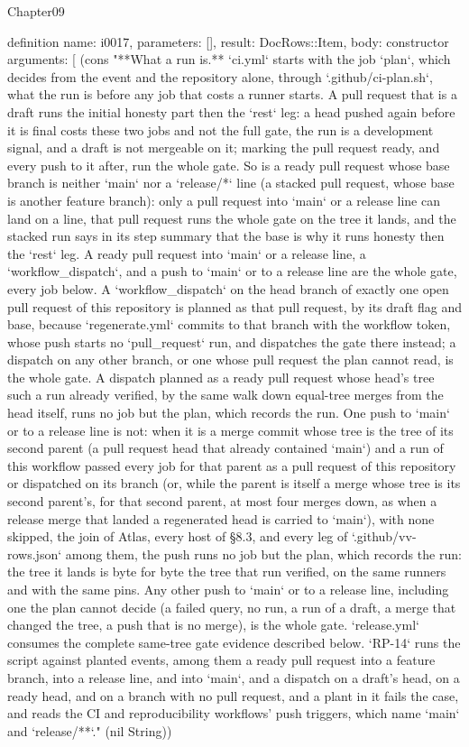 \begin{lexlean}{Chapter09}
\begin{semanticmodule}
definition{
  name: i0017,
  parameters: [],
  result: DocRows::Item,
  body: constructor{
    arguments: [
      (cons "**What a run is.** `ci.yml` starts with the job `plan`, which decides from the event and the repository alone, through `.github/ci-plan.sh`, what the run is before any job that costs a runner starts. A pull request that is a draft runs the initial honesty part then the `rest` leg: a head pushed again before it is final costs these two jobs and not the full gate, the run is a development signal, and a draft is not mergeable on it; marking the pull request ready, and every push to it after, run the whole gate. So is a ready pull request whose base branch is neither `main` nor a `release/*` line (a stacked pull request, whose base is another feature branch): only a pull request into `main` or a release line can land on a line, that pull request runs the whole gate on the tree it lands, and the stacked run says in its step summary that the base is why it runs honesty then the `rest` leg. A ready pull request into `main` or a release line, a `workflow_dispatch`, and a push to `main` or to a release line are the whole gate, every job below. A `workflow_dispatch` on the head branch of exactly one open pull request of this repository is planned as that pull request, by its draft flag and base, because `regenerate.yml` commits to that branch with the workflow token, whose push starts no `pull_request` run, and dispatches the gate there instead; a dispatch on any other branch, or one whose pull request the plan cannot read, is the whole gate. A dispatch planned as a ready pull request whose head's tree such a run already verified, by the same walk down equal-tree merges from the head itself, runs no job but the plan, which records the run. One push to `main` or to a release line is not: when it is a merge commit whose tree is the tree of its second parent (a pull request head that already contained `main`) and a run of this workflow passed every job for that parent as a pull request of this repository or dispatched on its branch (or, while the parent is itself a merge whose tree is its second parent's, for that second parent, at most four merges down, as when a release merge that landed a regenerated head is carried to `main`), with none skipped, the join of Atlas, every host of §8.3, and every leg of `.github/vv-rows.json` among them, the push runs no job but the plan, which records the run: the tree it lands is byte for byte the tree that run verified, on the same runners and with the same pins. Any other push to `main` or to a release line, including one the plan cannot decide (a failed query, no run, a run of a draft, a merge that changed the tree, a push that is no merge), is the whole gate. `release.yml` consumes the complete same-tree gate evidence described below. `RP-14` runs the script against planted events, among them a ready pull request into a feature branch, into a release line, and into `main`, and a dispatch on a draft's head, on a ready head, and on a branch with no pull request, and a plant in it fails the case, and reads the CI and reproducibility workflows' push triggers, which name `main` and `release/**`." (nil String))
}}
\end{semanticmodule}
\end{lexlean}
